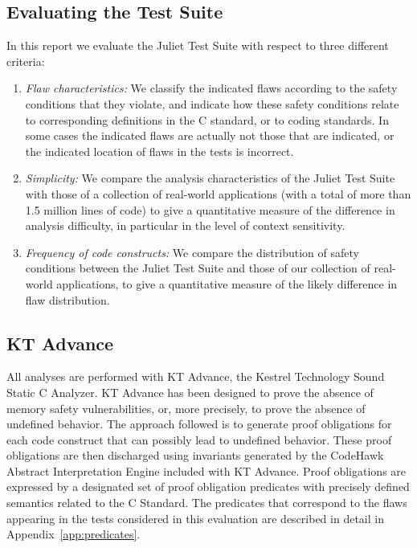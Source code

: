 \documentclass[11pt]{article}
\begin{document}
\subsection{Evaluating the Test Suite}
In this report we evaluate the Juliet Test Suite with respect to three different
criteria:
\begin{enumerate}
\item {\it Flaw characteristics:} We classify the indicated flaws according to
the safety conditions that they violate, and indicate how these safety conditions 
relate to corresponding definitions in the C standard, or to coding standards. 
In some cases the indicated flaws are actually not those that are indicated, or
the indicated location of flaws in the tests is incorrect. 
\item {\it Simplicity:} We compare the analysis characteristics of the Juliet Test
Suite with those of a collection of real-world applications (with a total of more
than 1.5 million lines of code) to give a quantitative measure of the difference
in analysis difficulty, in particular in the level of context sensitivity.
\item {\it Frequency of code constructs:} We compare the distribution of safety
conditions between the Juliet Test Suite and those of our collection of real-world
applications, to give a quantitative measure of the likely difference in flaw
distribution.
\end{enumerate}

\subsection{KT Advance}
All analyses are performed with KT Advance, the Kestrel Technology Sound
Static C Analyzer. KT Advance has been designed to prove the absence of
memory safety vulnerabilities, or, more precisely, to prove the absence
of undefined behavior. The approach followed is to generate proof obligations
for each code construct that can possibly lead to undefined behavior. These
proof obligations are then discharged using invariants generated by the
CodeHawk Abstract Interpretation Engine included with KT Advance. Proof
obligations are expressed by a designated set of proof obligation predicates
with precisely defined semantics related to the C Standard. The predicates
that correspond to the flaws appearing in the tests considered in this
evaluation are described in detail in Appendix~\ref{app:predicates}.
\end{document}

